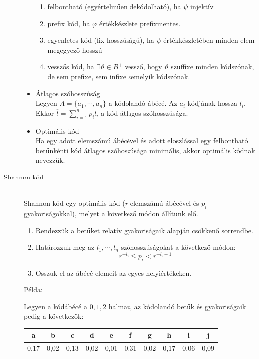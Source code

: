 \documentclass[margin=0px]{article}
\begin{document}
\begin{description}
\begin{itemize}
                  \begin{enumerate}
                      \item felbontható (egyértelműen dekódolható), ha $\psi$ injektív
                      \item prefix kód, ha $\varphi$ értékkészlete prefixmentes.
                      \item egyenletes kód (fix hosszúságú), ha $\psi$ értékkészletében minden elem megegyező hosszú
                      \item vesszős kód, ha $\exists \vartheta \in B^+$ vessző, hogy $\vartheta$ szuffixe minden kódszónak, de sem prefixe, sem infixe semelyik kódszónak.
                  \end{enumerate}
            \item Átlagos szóhosszúság \\
                  Legyen $A = \{a_1,\cdots, a_n\}$ a kódolandó ábécé. Az $a_i$ kódjának hossza $l_i$. Ekkor $\overline{l} = \sum_{i=1}^{n}p_il_i$ a kód átlagos szóhosszúsága.
            \item Optimális kód \\
                  Ha egy adott elemszámú ábécével és adott eloszlással egy felbontható betűnkénti kód átlagos szóhoszúsága minimális, akkor optimális kódnak nevezzük.
        \end{itemize}
    \item[Shannon-kód] \hfill \\
        Shannon kód egy optimális kód ($r$ elemszámú ábécével és $p_i$ gyakoriságokkal), melyet a következő módon állítunk elő.
        \begin{enumerate}
            \item Rendezzük a betűket relatív gyakoriságaik alapján csökkenő sorrendbe.
            \item Határozzuk meg az $l_1,\cdots,l_n$ szóhosszúságokat a következő módon:
                  \[r^{-l_i} \leq p_i < r^{-l_i+1} \]
            \item Osszuk el az ábécé elemeit az egyes helyiértékeken.
        \end{enumerate}
        Példa:

        Legyen a kódábécé a ${0,1,2}$ halmaz, az kódolandó betűk és gyakoriságaik pedig a következők:

        \begin{tabular}{|c|c|c|c|c|c|c|c|c|c|}
            \hline a    & b    & c    & d    & e    & f    & g    & h    & i    & j    \\
            \hline 0,17 & 0,02 & 0,13 & 0,02 & 0,01 & 0,31 & 0,02 & 0,17 & 0,06 & 0,09 \\
            \hline
        \end{tabular}


\end{description}
\end{document}
